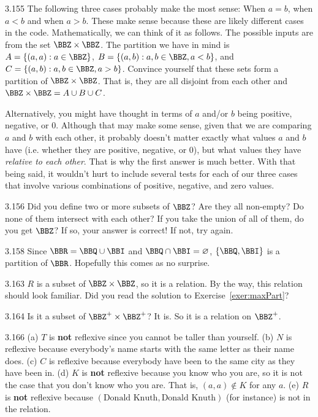 \begin{Answer}{3.155}
The following three cases probably make the most sense: When $a=b$, when $a<b$ and when $a>b$.
These make sense because these are likely different cases in the code.
Mathematically, we can think of it as follows.  The possible inputs are from the set $\BBZ\times\BBZ$.
The partition we have in mind is $A=\{(a,a) : a\in \BBZ\}$, $B=\{(a,b) : a,b\in \BBZ, a<b\}$, and
$C=\{(a,b) : a,b\in \BBZ, a>b\}$.  Convince yourself that these sets form a partition of $\BBZ\times\BBZ$.
That is, they are all disjoint from each other and $\BBZ\times\BBZ =A\cup B\cup C$.

Alternatively, you might have thought in terms of $a$ and/or $b$ being positive, negative, or $0$.
Although that may make some sense, given that we are comparing $a$ and $b$ with each other, it probably
doesn't matter exactly what values $a$ and $b$ have (i.e. whether they are positive, negative, or $0$),
but what values they have {\em relative to each other}.  That is why the first answer is much better.
With that being said, it wouldn't hurt to include several tests for each of our three cases that involve
various combinations of positive, negative, and zero values.
\end{Answer}
\begin{Answer}{3.156}
Did you define two or more subsets of $\BBZ$?
Are they all non-empty?
Do none of them intersect with each other?
If you take the union of all of them, do you get $\BBZ$?
If so, your answer is correct!  If not, try again.
\end{Answer}
\begin{Answer}{3.158}
Since $\BBR = \BBQ \cup \BBI$ and $\BBQ \cap \BBI = \varnothing$, $\{\BBQ,\BBI\}$ is a partition of $\BBR$.
Hopefully this comes as no surprise.
\end{Answer}
\begin{Answer}{3.163}
$R$ is a subset of $\BBZ\times\BBZ$, so it is a relation.
By the way, this relation should look familiar.
Did you read the solution to Exercise~\ref{exer:maxPart}?
\end{Answer}
\begin{Answer}{3.164}
Is it a subset of $\BBZ^+\times\BBZ^+$?  It is.  So it is a relation on $\BBZ^+$.
\end{Answer}
\begin{Answer}{3.166}
(a) $T$ is {\bf not} reflexive since you cannot be taller than yourself.
(b) $N$ is reflexive because everybody's name starts with the same letter as their name does.
(c) $C$ is reflexive because everybody have been to the same city as they have been in.
(d) $K$ is {\bf not} reflexive because you know who you are,
so it is not the case that you don't know who you are.  That is, $(a,a)\not\in K$ for any $a$.
(e) $R$ is {\bf not} reflexive because $(\mbox{Donald Knuth}, \mbox{Donald Knuth})$
(for instance) is not in the relation.
\end{Answer}
